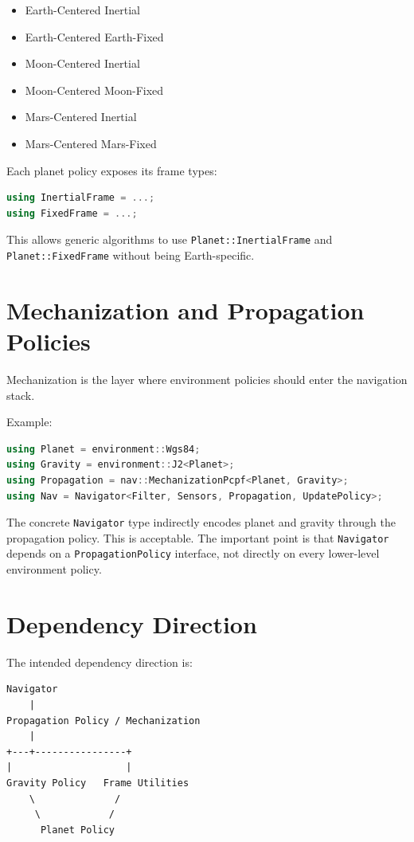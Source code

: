 \documentclass[11pt]{article}
\begin{document}
\begin{itemize}
    \item Earth-Centered Inertial
    \item Earth-Centered Earth-Fixed
    \item Moon-Centered Inertial
    \item Moon-Centered Moon-Fixed
    \item Mars-Centered Inertial
    \item Mars-Centered Mars-Fixed
\end{itemize}

Each planet policy exposes its frame types:

\begin{lstlisting}[language=C++]
using InertialFrame = ...;
using FixedFrame = ...;
\end{lstlisting}

This allows generic algorithms to use \texttt{Planet::InertialFrame} and
\texttt{Planet::FixedFrame} without being Earth-specific.

\section{Mechanization and Propagation Policies}

Mechanization is the layer where environment policies should enter the
navigation stack.

Example:

\begin{lstlisting}[language=C++]
using Planet = environment::Wgs84;
using Gravity = environment::J2<Planet>;
using Propagation = nav::MechanizationPcpf<Planet, Gravity>;
using Nav = Navigator<Filter, Sensors, Propagation, UpdatePolicy>;
\end{lstlisting}

The concrete \texttt{Navigator} type indirectly encodes planet and gravity
through the propagation policy. This is acceptable. The important point is
that \texttt{Navigator} depends on a \texttt{PropagationPolicy} interface, not
directly on every lower-level environment policy.

\section{Dependency Direction}

The intended dependency direction is:

\begin{verbatim}
Navigator
    |
Propagation Policy / Mechanization
    |
+---+----------------+
|                    |
Gravity Policy   Frame Utilities
    \              /
     \            /
      Planet Policy
\end{verbatim}
\end{document}
